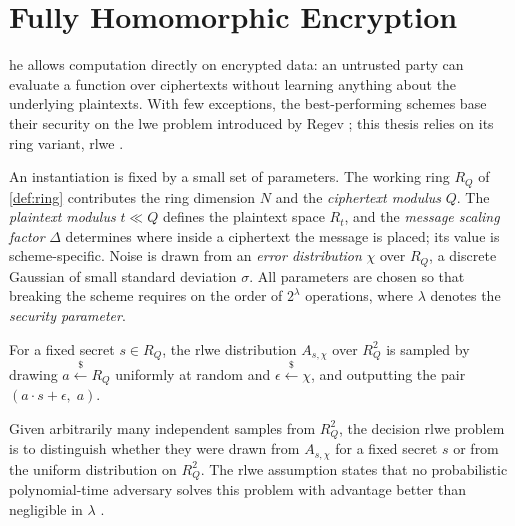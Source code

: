 \section{Fully Homomorphic Encryption}
\label{sec:fhe}
\gls{he} allows computation directly on encrypted data: an untrusted party can evaluate a function over ciphertexts without learning anything about the underlying plaintexts. %
With few exceptions, the best-performing schemes \cite{cryptoeprint:2011/277, cryptoeprint:2012/144, cryptoeprint:2016/421, cryptoeprint:2018/421} base their security on the \gls{lwe} problem introduced by Regev \cite{regev:2009}; this thesis relies on its ring variant, \gls{rlwe} \cite{cryptoeprint:2012/230}.

An instantiation is fixed by a small set of parameters. The working ring $R_Q$ of \autoref{def:ring} contributes the ring dimension $N$ and the \emph{ciphertext modulus} $Q$. The \emph{plaintext modulus} $t \ll Q$ defines the plaintext space $R_t$, and the \emph{message scaling factor} $\Delta$ determines where inside a ciphertext the message is placed; its value is scheme-specific. Noise is drawn from an \emph{error distribution} $\chi$ over $R_Q$, a discrete Gaussian of small standard deviation $\sigma$. All parameters are chosen so that breaking the scheme requires on the order of $2^\lambda$ operations, where $\lambda$ denotes the \emph{security parameter}.

\begin{definition}
    \label{def:rlwe-dist}
    For a fixed secret $s \in R_Q$, the \gls{rlwe} distribution $A_{s,\chi}$ over $R_Q^2$ is sampled by drawing $a \overset{\$}{\leftarrow} R_Q$ uniformly at random and $\epsilon \overset{\$}{\leftarrow} \chi$, and outputting the pair $(a \cdot s + \epsilon,\; a)$.
\end{definition}

\begin{definition}
    \label{def:rlwe-problem}
    Given arbitrarily many independent samples from $R_Q^2$, the decision \gls{rlwe} problem is to distinguish whether they were drawn from $A_{s,\chi}$ for a fixed secret $s$ or from the uniform distribution on $R_Q^2$. The \gls{rlwe} assumption states that no probabilistic polynomial-time adversary solves this problem with advantage better than negligible in $\lambda$ \cite{regev:2009, cryptoeprint:2012/230}.
\end{definition}

